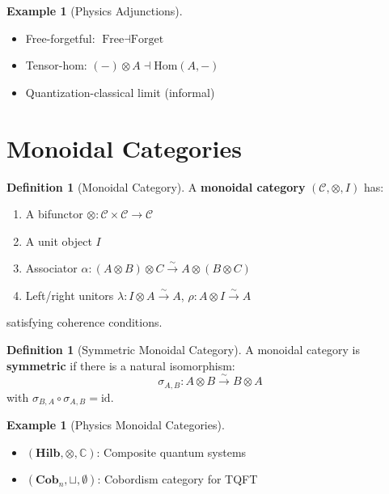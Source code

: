 \documentclass[11pt,a4paper,openright]{book}
\theoremstyle{plain}
\theoremstyle{definition}
\newtheorem{definition}[theorem]{Definition}
\newtheorem{example}[theorem]{Example}
\newcommand{\Hom}{\mathrm{Hom}}
\newcommand{\id}{\mathrm{id}}
\newcommand{\C}{\mathbb{C}}
\newcommand{\Hilb}{\mathbf{Hilb}}
\begin{document}
\begin{example}[Physics Adjunctions]
\begin{itemize}
    \item Free-forgetful: $\text{Free} \dashv \text{Forget}$
    \item Tensor-hom: $(-) \otimes A \dashv \Hom(A, -)$
    \item Quantization-classical limit (informal)
\end{itemize}
\end{example}

\section{Monoidal Categories}

\begin{definition}[Monoidal Category]
A \textbf{monoidal category} $(\mathcal{C}, \otimes, I)$ has:
\begin{enumerate}[label=(\roman*)]
    \item A bifunctor $\otimes: \mathcal{C} \times \mathcal{C} \to \mathcal{C}$
    \item A unit object $I$
    \item Associator $\alpha: (A \otimes B) \otimes C \xrightarrow{\sim} A \otimes (B \otimes C)$
    \item Left/right unitors $\lambda: I \otimes A \xrightarrow{\sim} A$, $\rho: A \otimes I \xrightarrow{\sim} A$
\end{enumerate}
satisfying coherence conditions.
\end{definition}

\begin{definition}[Symmetric Monoidal Category]
A monoidal category is \textbf{symmetric} if there is a natural isomorphism:
\begin{equation}
\sigma_{A,B}: A \otimes B \xrightarrow{\sim} B \otimes A
\end{equation}
with $\sigma_{B,A} \circ \sigma_{A,B} = \id$.
\end{definition}

\begin{example}[Physics Monoidal Categories]
\begin{itemize}
    \item $(\Hilb, \otimes, \C)$: Composite quantum systems
    \item $(\mathbf{Cob}_n, \sqcup, \emptyset)$: Cobordism category for TQFT
\end{itemize}
\end{example}
\end{document}
